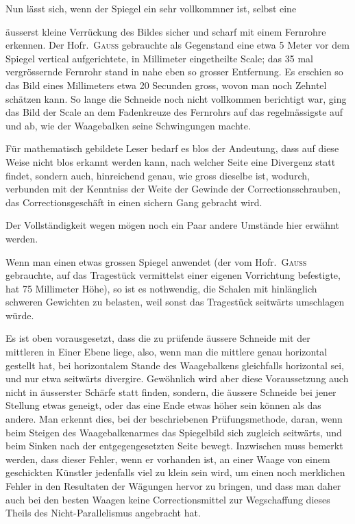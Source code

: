 Nun lässt sich, wenn der Spiegel ein sehr vollkommner ist, selbst eine

\par\clearpage
{}
\noindent äusserst kleine Verrückung des Bildes sicher und scharf mit einem Fernrohre erkennen. Der Hofr.\ \textsc{Gauss} gebrauchte als Gegenstand eine etwa 5 Meter vor dem Spiegel vertical aufgerichtete, in Millimeter eingetheilte Scale; das 35 mal vergrössernde Fernrohr stand in nahe eben so grosser Entfernung. Es erschien so das Bild eines Millimeters etwa 20 Secunden gross, wovon man noch Zehntel schätzen kann. So lange die Schneide noch nicht vollkommen berichtigt war, ging das Bild der Scale an dem Fadenkreuze des Fernrohrs auf das regelmässigste auf und ab, wie der Waagebalken seine Schwingungen machte.

Für mathematisch gebildete Leser bedarf es blos der Andeutung, dass auf diese Weise nicht blos erkannt werden kann, nach welcher Seite eine Divergenz statt findet, sondern auch, hinreichend genau, wie gross dieselbe ist, wodurch, verbunden mit der Kenntniss der Weite der Gewinde der Correctionsschrauben, das Correctionsgeschäft in einen sichern Gang gebracht wird.

Der Vollständigkeit wegen mögen noch ein Paar andere Umstände hier erwähnt werden.

Wenn man einen etwas grossen Spiegel anwendet (der vom Hofr.\ \textsc{Gauss} gebrauchte, auf das Tragestück vermittelst einer eigenen Vorrichtung befestigte, hat 75 Millimeter Höhe), so ist es nothwendig, die Schalen mit hinlänglich schweren Gewichten zu belasten, weil sonst das Tragestück seitwärts umschlagen würde.

Es ist oben vorausgesetzt, dass die zu prüfende äussere Schneide mit der mittleren in Einer Ebene liege, also, wenn man die mittlere genau horizontal gestellt hat, bei horizontalem Stande des Waagebalkens gleichfalls horizontal sei, und nur etwa seitwärts divergire. Gewöhnlich wird aber diese Voraussetzung auch nicht in äusserster Schärfe statt finden, sondern, die äussere Schneide bei jener Stellung etwas geneigt, oder das eine Ende etwas höher sein können als das andere. Man erkennt dies, bei der beschriebenen Prüfungsmethode, daran, wenn beim Steigen des Waagebalkenarmes das Spiegelbild sich zugleich seitwärts, und beim Sinken nach der entgegengesetzten Seite bewegt. Inzwischen muss bemerkt werden, dass dieser Fehler, wenn er vorhanden ist, an einer Waage von einem geschickten Künstler jedenfalls viel zu klein sein wird, um einen noch merklichen Fehler in den Resultaten der Wägungen hervor zu bringen, und dass man daher auch bei den besten Waagen keine Correctionsmittel zur Wegschaffung dieses Theils des Nicht-Parallelismus angebracht hat.

